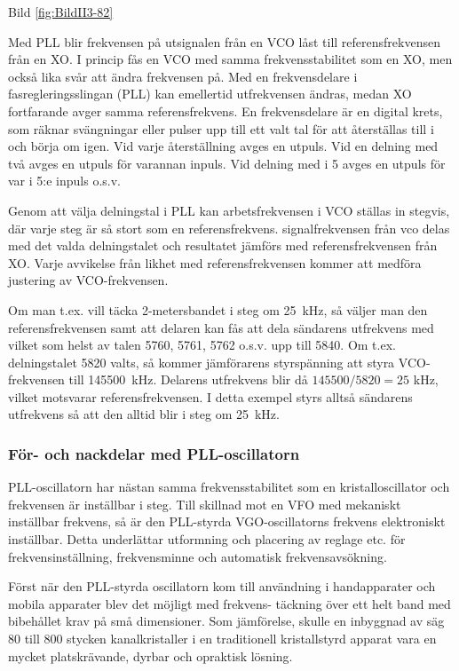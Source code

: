 Bild \ref{fig:BildII3-82}

Med PLL blir frekvensen på utsignalen från en VCO låst till
referensfrekvensen från en XO. I princip fås en VCO med samma
frekvensstabilitet som en XO, men också lika svår att ändra frekvensen
på. Med en frekvensdelare i fasregleringsslingan (PLL) kan emellertid
utfrekvensen ändras, medan XO fortfarande avger samma
referensfrekvens.  En frekvensdelare är en digital krets, som räknar
svängningar eller pulser upp till ett valt tal för att återställas
till i och börja om igen. Vid varje återställning avges en utpuls.
Vid en delning med två avges en utpuls för varannan inpuls. Vid
delning med i 5 avges en utpuls för var i 5:e inpuls o.s.v.

Genom att välja delningstal i PLL kan arbetsfrekvensen i VCO ställas
in stegvis, där varje steg är så stort som en
referensfrekvens. signalfrekvensen från vco delas med det valda
delningstalet och resultatet jämförs med referensfrekvensen från XO.
Varje avvikelse från likhet med referensfrekvensen kommer att
medföra justering av VCO-frekvensen.

Om man t.ex. vill täcka 2-metersbandet i steg om 25~kHz, så väljer
man den referensfrekvensen samt att delaren kan fås att dela sändarens
utfrekvens med vilket som helst av talen 5760, 5761, 5762 o.s.v. upp
till 5840. Om t.ex. delningstalet 5820 valts, så kommer jämförarens
styrspänning att styra VCO-frekvensen till 145500~kHz. Delarens
utfrekvens blir då \(145500/5820 = 25\) kHz, vilket motsvarar
referensfrekvensen. I detta exempel styrs alltså sändarens utfrekvens
så att den alltid blir i steg om 25~kHz.

\subsubsection{För- och nackdelar med PLL-oscillatorn}

PLL-oscillatorn har nästan samma frekvensstabilitet som en
kristalloscillator och frekvensen är inställbar i steg. Till skillnad
mot en VFO med mekaniskt inställbar frekvens, så är den PLL-styrda
VGO-oscillatorns frekvens elektroniskt inställbar. Detta underlättar
utformning och placering av reglage etc. för frekvensinställning,
frekvensminne och automatisk frekvensavsökning.

Först när den PLL-styrda oscillatorn kom till användning i
handapparater och mobila apparater blev det möjligt med frekvens-
täckning över ett helt band med bibehållet krav på små
dimensioner. Som jämförelse, skulle en inbyggnad av säg 80 till 800
stycken kanalkristaller i en traditionell kristallstyrd apparat vara
en mycket platskrävande, dyrbar och opraktisk lösning.

